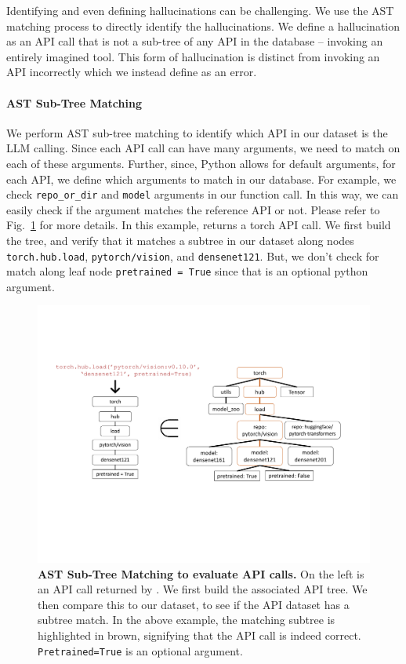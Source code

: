 Identifying and even defining hallucinations can be challenging. 
We use the AST matching process to directly identify the hallucinations. 
We define a hallucination as an API call that is not a sub-tree of any API in the database -- invoking an entirely imagined tool.
This form of hallucination is distinct from invoking an API incorrectly which we instead define as an error.


\paragraph{AST Sub-Tree Matching} We perform AST sub-tree matching to identify which API in our dataset is the LLM calling. Since each API call can have many arguments, we need to match on each of these arguments. Further, since, Python allows for default arguments, for each API, we define which arguments to match in our database. For example, we check \texttt{repo\_or\_dir} and \texttt{model} arguments in our function call. In this way, we can easily check if the argument matches the reference API or not. Please refer to Fig.~\ref{fig:ast} for more details. In this example, \gorilla{} returns a torch API call. We first build the tree, and verify that it matches a sub\-tree in our dataset along nodes \texttt{torch.hub.load}, \texttt{pytorch/vision}, and \texttt{densenet121}. But, we don't check for match along leaf node \texttt{pretrained = True} since that is an optional python argument. 


\begin{figure}[t]
    \includegraphics[width=\linewidth]{figures/ast.pdf}
\caption{\footnotesize \textbf{AST Sub-Tree Matching to evaluate API calls.} On the left is an API call returned by \gorilla{}. We first build the associated API tree. We then compare this to our dataset, to see if the API dataset has a sub\-tree match. In the above example, the matching sub\-tree is highlighted in brown, signifying that the API call is indeed correct. \texttt{Pretrained=True} is an optional argument.}
\label{fig:ast}
\end{figure}


 



